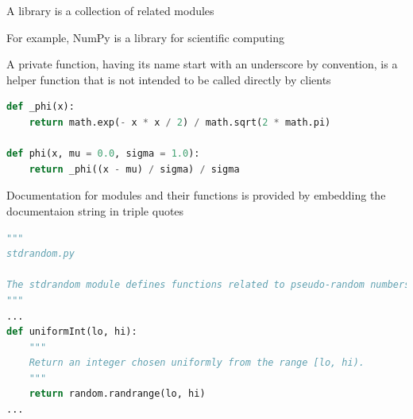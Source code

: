 \documentclass[8pt,a4paper,compress]{beamer}
\begin{document}
\begin{frame}[fragile]
\pause

A library is a collection of related modules

\pause
\bigskip

For example, NumPy is a library for scientific computing

\pause
\bigskip

A private function, having its name start with an underscore by convention, is a helper function that is not intended to be called directly by clients
\begin{lstlisting}[language=Python,style=focusin]
def _phi(x):
    return math.exp(- x * x / 2) / math.sqrt(2 * math.pi)
    
def phi(x, mu = 0.0, sigma = 1.0):
    return _phi((x - mu) / sigma) / sigma
\end{lstlisting}

\pause
\bigskip

Documentation for modules and their functions is provided by embedding the documentaion string in triple quotes
\begin{lstlisting}[language=Python,style=focusin]
"""
stdrandom.py

The stdrandom module defines functions related to pseudo-random numbers.
"""
...
def uniformInt(lo, hi):
    """
    Return an integer chosen uniformly from the range [lo, hi).
    """
    return random.randrange(lo, hi)
...
\end{lstlisting}
\end{frame}
\end{document}

